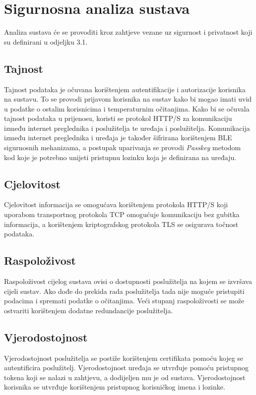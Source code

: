 \documentclass[times, utf8, diplomski]{fer}
\begin{document}
\section{Sigurnosna analiza sustava}
Analiza sustava će se provoditi kroz zahtjeve vezane uz sigurnost i privatnost koji su definirani u odjeljku 3.1.

\subsection{Tajnost}
Tajnost podataka je očuvana korištenjem autentifikacije i autorizacije korisnika na sustavu. To se provodi prijavom korisnika na sustav kako bi mogao imati uvid u podatke o ostalim korisnicima i temperaturnim očitanjima. Kako bi se očuvala tajnost podataka u prijenosu, koristi se protokol HTTP/S za komunikaciju između internet preglednika i poslužitelja te uređaja i poslužitelja. Komunikacija između internet preglednika i uređaja je također šifrirana korištenjem BLE sigurnosnih mehanizama, a postupak uparivanja se provodi \emph{Passkey} metodom kod koje je potrebno unijeti pristupnu lozinku koja je definirana na uređaju.

\subsection{Cjelovitost}
Cjelovitost informacija se omogućava korištenjem protokola HTTP/S koji uporabom transportnog protokola TCP omogućuje komunikaciju bez gubitka informacija, a korištenjem kriptografskog protokola TLS se osigurava točnost podataka.

\subsection{Raspoloživost}
Raspoloživost cijelog sustava ovisi o dostupnosti poslužitelja na kojem se izvršava cijeli sustav. Ako dođe do prekida rada poslužitelja tada nije moguće pristupiti podacima i spremati podatke o očitanjima. Veći stupanj raspoloživosti se može ostvariti korištenjem dodatne redundancije poslužitelja.

\subsection{Vjerodostojnost}
Vjerodostojnost poslužitelja se postiže korištenjem certifikata pomoću kojeg se autentificira poslužitelj. Vjerodostojnost uređaja se utvrđuje pomoću pristupnog tokena koji se nalazi u zahtjevu, a dodijeljen mu je od sustava. Vjerodostojnost korisnika se utvrđuje korištenjem pristupnog korisničkog imena i lozinke.
\end{document}
